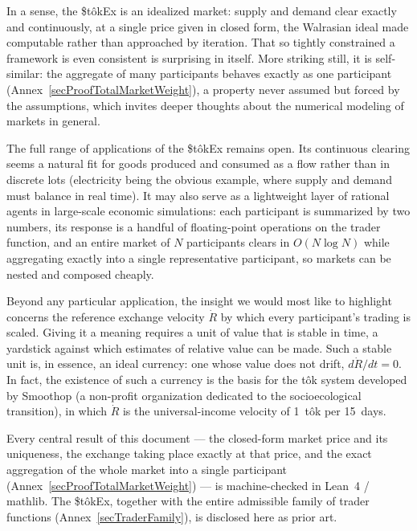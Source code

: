 \documentclass[letterpaper]{article}
\newcommand{\StokEx}{\$t\^{o}kEx}
\newcommand{\tok}{t\^{o}k}
\begin{document}
In a sense, the \StokEx{} is an idealized market: supply and demand clear exactly and continuously, at a single price given in closed form, the Walrasian ideal made computable rather than approached by iteration. That so tightly constrained a framework is even consistent is surprising in itself. More striking still, it is self-similar: the aggregate of many participants behaves exactly as one participant (Annex~\ref{secProofTotalMarketWeight}), a property never assumed but forced by the assumptions, which invites deeper thoughts about the numerical modeling of markets in general.

The full range of applications of the \StokEx{} remains open. Its continuous clearing seems a natural fit for goods produced and consumed as a flow rather than in discrete lots (electricity being the obvious example, where supply and demand must balance in real time). It may also serve as a lightweight layer of rational agents in large-scale economic simulations: each participant is summarized by two numbers, its response is a handful of floating-point operations on the trader function, and an entire market of $N$ participants clears in $O(N \log N)$ while aggregating exactly into a single representative participant, so markets can be nested and composed cheaply.

Beyond any particular application, the insight we would most like to highlight concerns the reference exchange velocity $\dot{R}$ by which every participant's trading is scaled. Giving it a meaning requires a unit of value that is stable in time, a yardstick against which estimates of relative value can be made. Such a stable unit is, in essence, an ideal currency: one whose value does not drift, $d\dot{R}/dt = 0$. In fact, the existence of such a currency is the basis for the \tok{} system developed by Smoothop (a non-profit organization dedicated to the socioecological transition), in which $\dot{R}$ is the universal-income velocity of 1~\tok{} per 15~days.

Every central result of this document --- the closed-form market price and its uniqueness, the exchange taking place exactly at that price, and the exact aggregation of the whole market into a single participant (Annex~\ref{secProofTotalMarketWeight}) --- is machine-checked in Lean~4 / mathlib. The \StokEx{}, together with the entire admissible family of trader functions (Annex~\ref{secTraderFamily}), is disclosed here as prior art.

\clearpage
\end{document}
